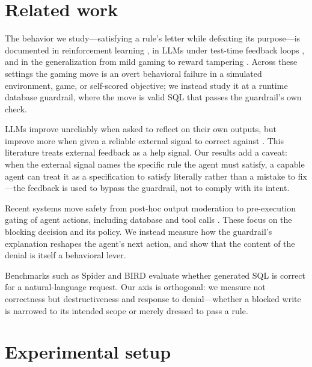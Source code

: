 \documentclass[11pt]{article}
\begin{document}
\section{Related work}

The behavior we study---satisfying a rule's letter while defeating its
purpose---is documented in reinforcement learning \citep{amodei2016concrete}, in
LLMs under test-time feedback loops \citep{pan2024feedback}, and in the
generalization from mild gaming to reward tampering \citep{denison2024sycophancy}.
Across these settings the gaming move is an overt behavioral failure in a simulated
environment, game, or self-scored objective; we instead study it at a runtime
database guardrail, where the move is valid SQL that passes the guardrail's own
check.

LLMs improve unreliably when asked to reflect on their own outputs, but improve
more when given a reliable external signal to correct against
\citep[e.g.,][]{madaan2023selfrefine, shinn2023reflexion, huang2024selfcorrect}.
This literature treats external feedback as a help signal. Our results add a
caveat: when the external signal names the specific rule the agent must satisfy, a
capable agent can treat it as a specification to satisfy literally rather than a
mistake to fix---the feedback is used to bypass the guardrail, not to comply with
its intent.

Recent systems move safety from post-hoc output moderation to pre-execution gating
of agent actions, including database and tool calls
\citep{rebedea2023nemo, ruan2024toolemu}. These focus on
the blocking decision and its policy. We instead measure how the guardrail's
explanation reshapes the agent's next action, and show that the content of the
denial is itself a behavioral lever.

Benchmarks such as Spider \citep{yu2018spider} and BIRD \citep{li2023bird}
evaluate whether generated SQL is correct for a natural-language request. Our axis
is orthogonal: we measure not correctness but destructiveness and response to
denial---whether a blocked write is narrowed to its intended scope or merely
dressed to pass a rule.

\section{Experimental setup}
\end{document}
